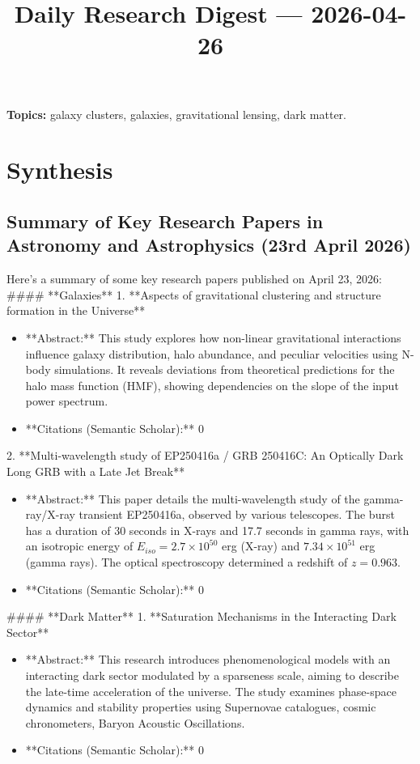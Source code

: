 \documentclass[11pt]{article}
\begin{document}
\title{Daily Research Digest --- 2026-04-26}
\author{}
\date{}
\maketitle
\textbf{Topics:} galaxy clusters, galaxies, gravitational lensing, dark matter.
\section*{Synthesis}
\subsection*{Summary of Key Research Papers in Astronomy and Astrophysics (23rd April 2026)}
Here's a summary of some key research papers published on April 23, 2026:
\#\#\#\# **Galaxies**
1. **Aspects of gravitational clustering and structure formation in the Universe**
\begin{itemize}
\item **Abstract:** This study explores how non-linear gravitational interactions influence galaxy distribution, halo abundance, and peculiar velocities using N-body simulations. It reveals deviations from theoretical predictions for the halo mass function (HMF), showing dependencies on the slope of the input power spectrum.
\item **Citations (Semantic Scholar):** 0
\end{itemize}
2. **Multi-wavelength study of EP250416a / GRB 250416C: An Optically Dark Long GRB with a Late Jet Break**
\begin{itemize}
\item **Abstract:** This paper details the multi-wavelength study of the gamma-ray/X-ray transient EP250416a, observed by various telescopes. The burst has a duration of 30 seconds in X-rays and 17.7 seconds in gamma rays, with an isotropic energy of \(E_{iso} = 2.7 \times 10^{50}\) erg (X-ray) and \(7.34 \times 10^{51}\) erg (gamma rays). The optical spectroscopy determined a redshift of \(z=0.963\).
\item **Citations (Semantic Scholar):** 0
\end{itemize}
\#\#\#\# **Dark Matter**
1. **Saturation Mechanisms in the Interacting Dark Sector**
\begin{itemize}
\item **Abstract:** This research introduces phenomenological models with an interacting dark sector modulated by a sparseness scale, aiming to describe the late-time acceleration of the universe. The study examines phase-space dynamics and stability properties using Supernovae catalogues, cosmic chronometers, Baryon Acoustic Oscillations.
\item **Citations (Semantic Scholar):** 0
\end{itemize}
\end{document}
